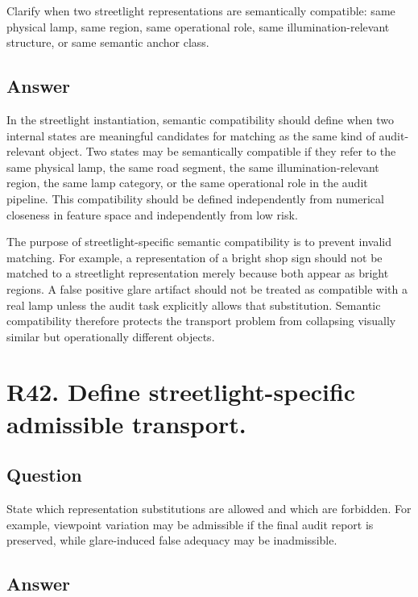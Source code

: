 \documentclass[11pt,a4paper]{article}
\begin{document}
Clarify when two streetlight representations are semantically compatible: same physical lamp, same region, same operational role, same illumination-relevant structure, or same semantic anchor class.

\subsection*{Answer}

In the streetlight instantiation, semantic compatibility should define when two internal states are meaningful candidates for matching as the same kind of audit-relevant object. Two states may be semantically compatible if they refer to the same physical lamp, the same road segment, the same illumination-relevant region, the same lamp category, or the same operational role in the audit pipeline. This compatibility should be defined independently from numerical closeness in feature space and independently from low risk.

The purpose of streetlight-specific semantic compatibility is to prevent invalid matching. For example, a representation of a bright shop sign should not be matched to a streetlight representation merely because both appear as bright regions. A false positive glare artifact should not be treated as compatible with a real lamp unless the audit task explicitly allows that substitution. Semantic compatibility therefore protects the transport problem from collapsing visually similar but operationally different objects.

\section*{R42. Define streetlight-specific admissible transport.}

\subsection*{Question}

State which representation substitutions are allowed and which are forbidden. For example, viewpoint variation may be admissible if the final audit report is preserved, while glare-induced false adequacy may be inadmissible.

\subsection*{Answer}
\end{document}
